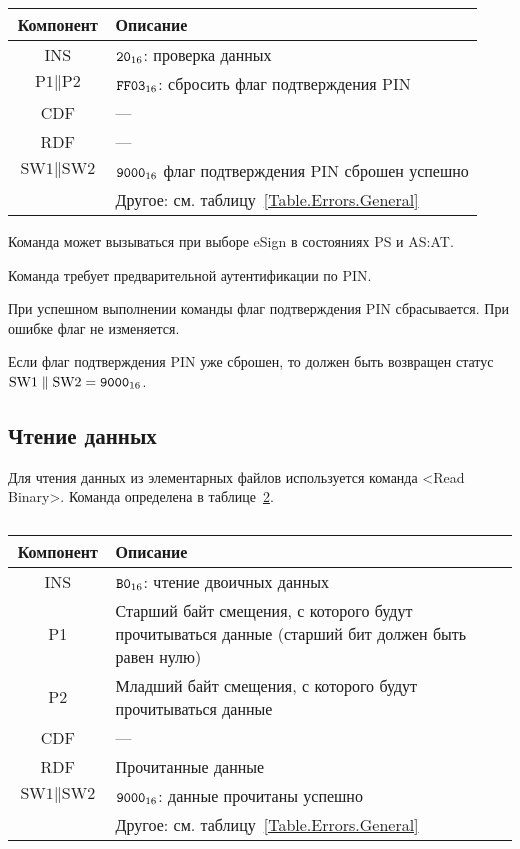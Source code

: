 \begin{table}[hbt]
\caption{}\label{Table.Oper.VerifyDeauthCmd}
\begin{tabular}{|c|p{14cm}|}
\hline
Компонент & Описание \\
\hline
\hline
INS & $\texttt{20}_{16}$: проверка данных\\
\hline
$\text{P1} \parallel \text{P2}$ & $\texttt{FF03}_{16}$: сбросить 
флаг подтверждения PIN\\
\hline
CDF & ---  \\
\hline 
\hline
RDF &  --- \\
\hline
$\text{SW1} \parallel \text{SW2}$ & $\texttt{9000}_{16}$ 
флаг подтверждения PIN сброшен успешно\\
\cline{2-2}
& Другое: см. таблицу~\ref{Table.Errors.General} \\
\hline
\end{tabular}
\end{table}

Команда может вызываться при выборе eSign в состояниях PS и AS:AT.

Команда требует предварительной аутентификации по PIN.

При успешном выполнении команды флаг подтверждения PIN
сбрасывается. При ошибке флаг не изменяется.

Если флаг подтверждения PIN уже сброшен, то должен быть возвращен статус
$\text{SW1} \parallel \text{SW2} = \texttt{9000}_{16}$.

\subsection{Чтение данных}
\label{Oper.Descr.Read}

Для чтения данных из элементарных файлов используется команда <Read Binary>.
Команда определена в таблице~\ref{Table.Oper.ReadCmd}.

\begin{table}[hbt]
\caption{}\label{Table.Oper.ReadCmd}
\begin{tabular}{|c|p{14cm}|}
\hline
Компонент & Описание \\
\hline
\hline
INS & $\texttt{B0}_{16}$: чтение двоичных данных \\
\hline
P1 & Старший байт смещения, с которого будут прочитываться данные 
(старший бит должен быть равен нулю)\\
\hline
P2 & Младший байт смещения, с которого будут прочитываться данные\\
\hline
CDF &  --- \\
\hline 
\hline
RDF & 	Прочитанные данные \\
\hline
$\text{SW1} \parallel\text{SW2}$ & 
$\texttt{9000}_{16}$: данные прочитаны успешно \\
\cline{2-2}
& Другое: см. таблицу~\ref{Table.Errors.General} \\
\hline
\end{tabular}
\end{table}

